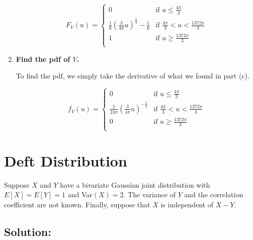 \documentclass{article}
\begin{document}
\begin{enumerate}[label=(\alph*)]
    $$\boxed{F_V(u) = \begin{cases}
    0 & \text{if } u \leq \frac{4\pi}{3} \\
    \frac{1}{6}\left(\frac{3}{4\pi }u\right)^{\frac{1}{3}} - \frac{1}{6} & \text{if } \frac{4\pi}{3} < u < \frac{1372\pi}{3} \\
    1 & \text{if } u \geq \frac{1372\pi}{3} \\
    \end{cases}}$$

    \vspace{2cm}
    
    \item \textbf{Find the pdf of $V$.}
    
    To find the pdf, we simply take the derivative of what we found in part (c).
    
    $$\boxed{f_V(u) = \begin{cases}
    0 & \text{if } u \leq \frac{4\pi}{3} \\
    \frac{1}{24\pi } \left(\frac{3}{4\pi }u\right)^{-\frac{2}{3}} & \text{if } \frac{4\pi}{3} < u < \frac{1372\pi}{3} \\
    0 & \text{if } u \geq \frac{1372\pi}{3} \\
    \end{cases}}$$
    
\end{enumerate}

\newpage

\section{Deft Distribution}

Suppose $X$ and $Y$ have a bivariate Gaussian joint distribution with $E[X] = E[Y] = 1$ and Var$(X) = 2$. The variance of $Y$ and the correlation coefficient are not known. Finally, suppose that $X$ is independent of $X - Y$.

\subsection{Solution:}
\end{document}
